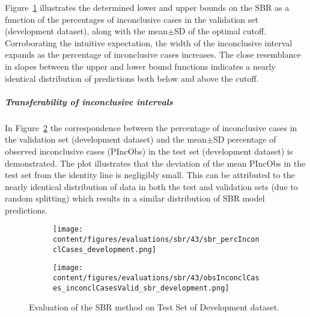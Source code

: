 Figure~\ref{fig:sbr_percInconclCases_development} illustrates the determined lower and upper bounds on the SBR 
as a function of the percentages of inconclusive cases in the validation set (development dataset), 
along with the mean$\pm$SD of the optimal cutoff.
Corroborating the intuitive expectation, the width of the inconclusive interval expands 
as the percentage of inconclusive cases increases.
The close resemblance in slopes between the upper and lower bound functions 
indicates a nearly identical distribution of predictions both below and above the cutoff.

\subparagraph{Transferability of inconclusive intervals}

In Figure~\ref{fig:obsInconclCases_inconclCasesValid_sbr_development} the correspondence between 
the percentage of inconclusive cases in the validation set (development dataset) and 
the mean$\pm$SD percentage of observed inconclusive cases (PIncObs) in the test set (development dataset) is demonstrated.
The plot illustrates that the deviation of the mean PIncObs in the test set from the 
identity line is negligibly small.
This can be attributed to the nearly identical distribution of data in both the test and validation sets 
(due to random splitting) which results in a similar distribution of SBR model predictions.


\begin{figure}[ht]
  \begin{subfigure}{0.48\textwidth}
    \centering
    \texttt{[image: content/figures/evaluations/sbr/43/sbr\_percInconclCases\_development.png]}
    \label{fig:sbr_percInconclCases_development}
  \end{subfigure}
  \hfill
  \begin{subfigure}{0.495\textwidth}
    \centering
    \texttt{[image: content/figures/evaluations/sbr/43/obsInconclCases\_inconclCasesValid\_sbr\_development.png]}
    \label{fig:obsInconclCases_inconclCasesValid_sbr_development}
  \end{subfigure}

  \caption{Evaluation of the SBR method on Test Set of Development dataset.}
  \label{fig:}
\end{figure}

